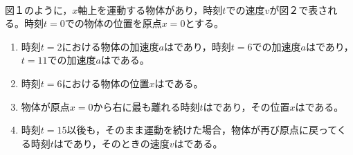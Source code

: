 \hakosyokika
\item
    \begin{mawarikomi}{150pt}{\\
        }
        図１のように，$x$軸上を運動する物体があり，時刻$t$での速度$v$が図２で表される。時刻$t=0$での物体の位置を原点$x=0$とする。
        \begin{enumerate}
            \item 時刻$t=2$における物体の加速度$a$は\Hako {}であり，時刻$t=6$での加速度$a$は\Hako {}であり，$t=11$での加速度$a$は\Hako {}である。
            \item 時刻$t=6$における物体の位置$x$は\Hako {}である。
            \item 物体が原点$x=0$から右に最も離れる時刻$t$は\Hako {}であり，その位置$x$は\Hako {}である。
            \item 時刻$t=15$以後も，そのまま運動を続けた場合，物体が再び原点に戻ってくる時刻$t$は\Hako {}であり，そのときの速度$v$は\Hako {}である。
        \end{enumerate}
    \end{mawarikomi}